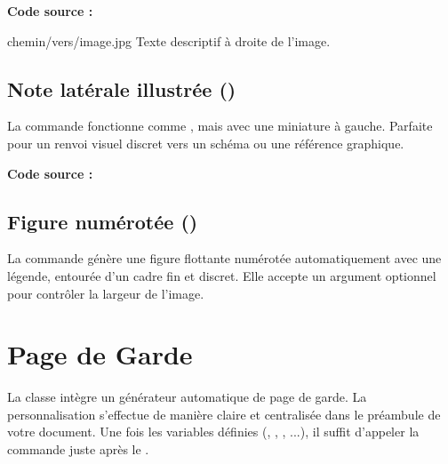 \documentclass[theme=acerola]{myrtille}
\begin{document}
\textbf{Code source :}
\begin{texblock}
\begin{imgfloat}{chemin/vers/image.jpg}
  Texte descriptif à droite de l'image.
\end{imgfloat}
\end{texblock}

\subsection{Note latérale illustrée ()}

La commande  fonctionne comme , mais avec une miniature à gauche. Parfaite pour un renvoi visuel discret vers un schéma ou une référence graphique.


\textbf{Code source :}
\begin{texblock}
\end{texblock}

\subsection{Figure numérotée ()}

La commande  génère une figure flottante numérotée automatiquement avec une légende, entourée d'un cadre fin et discret. Elle accepte un argument optionnel pour contrôler la largeur de l'image.


\section{Page de Garde}
La classe intègre un générateur automatique de page de garde. La personnalisation s'effectue de manière claire et centralisée dans le préambule de votre document. Une fois les variables définies (, , , ...), il suffit d'appeler la commande  juste après le .
\end{document}
